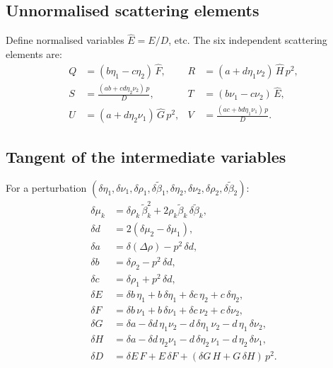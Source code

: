 \documentclass[11pt,a4paper]{article}
\theoremstyle{plain}
\theoremstyle{remark}
\begin{document}
\subsection{Unnormalised scattering elements}

Define normalised variables $\hat{E} = E/D$, etc.  The six independent
scattering elements are:
\begin{align}
  Q &= (b\eta_1 - c\eta_2)\,\hat{F},
  & R &= (a + d\eta_1\nu_2)\,\hat{H}\,p^2,
  \label{eq:QR}\\[4pt]
  S &= \frac{(ab + cd\eta_2\nu_2)\,p}{D},
  & T &= (b\nu_1 - c\nu_2)\,\hat{E},
  \label{eq:ST}\\[4pt]
  U &= (a + d\eta_2\nu_1)\,\hat{G}\,p^2,
  & V &= \frac{(ac + bd\eta_1\nu_1)\,p}{D}.
  \label{eq:UV}
\end{align}

\subsection{Tangent of the intermediate variables}\label{sec:tl-intermediate}

For a perturbation $(\delta\eta_1, \delta\nu_1, \delta\rho_1,
\delta\tilde\beta_1, \delta\eta_2, \delta\nu_2, \delta\rho_2,
\delta\tilde\beta_2)$:
\begin{align}
  \delta\mu_k &= \delta\rho_k\,\tilde\beta_k^2
               + 2\rho_k\tilde\beta_k\,\delta\tilde\beta_k,
  \label{eq:dmu}\\[4pt]
  \delta d &= 2(\delta\mu_2 - \delta\mu_1),
  \label{eq:dd}\\[4pt]
  \delta a &= \delta(\Delta\rho) - p^2\,\delta d,
  \label{eq:da}\\
  \delta b &= \delta\rho_2 - p^2\,\delta d,
  \label{eq:db}\\
  \delta c &= \delta\rho_1 + p^2\,\delta d,
  \label{eq:dc}\\[4pt]
  \delta E &= \delta b\,\eta_1 + b\,\delta\eta_1
            + \delta c\,\eta_2 + c\,\delta\eta_2,
  \label{eq:dE}\\
  \delta F &= \delta b\,\nu_1 + b\,\delta\nu_1
            + \delta c\,\nu_2 + c\,\delta\nu_2,
  \label{eq:dF}\\[4pt]
  \delta G &= \delta a - \delta d\,\eta_1\nu_2
            - d\,\delta\eta_1\,\nu_2 - d\,\eta_1\,\delta\nu_2,
  \label{eq:dG}\\
  \delta H &= \delta a - \delta d\,\eta_2\nu_1
            - d\,\delta\eta_2\,\nu_1 - d\,\eta_2\,\delta\nu_1,
  \label{eq:dH}\\[4pt]
  \delta D &= \delta E\,F + E\,\delta F
            + (\delta G\,H + G\,\delta H)\,p^2.
  \label{eq:dD}
\end{align}
\end{document}
